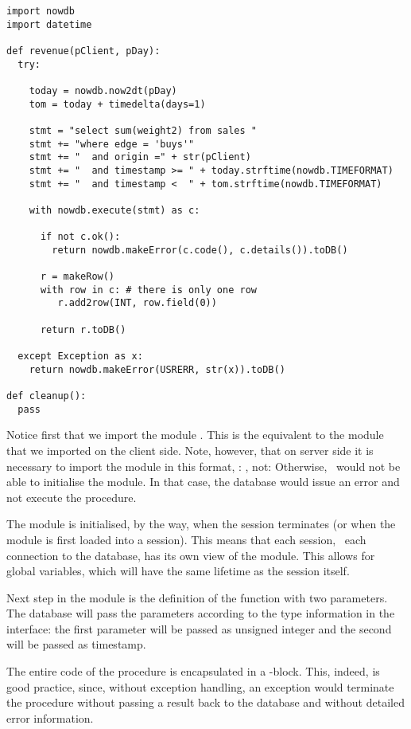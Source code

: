 \begin{python}
\begin{lstlisting}
import nowdb
import datetime

def revenue(pClient, pDay):
  try:

    today = nowdb.now2dt(pDay)
    tom = today + timedelta(days=1)

    stmt = "select sum(weight2) from sales "
    stmt += "where edge = 'buys'"
    stmt += "  and origin =" + str(pClient)
    stmt += "  and timestamp >= " + today.strftime(nowdb.TIMEFORMAT)
    stmt += "  and timestamp <  " + tom.strftime(nowdb.TIMEFORMAT)

    with nowdb.execute(stmt) as c:

      if not c.ok():
        return nowdb.makeError(c.code(), c.details()).toDB()

      r = makeRow()
      with row in c: # there is only one row
         r.add2row(INT, row.field(0))

      return r.toDB()

  except Exception as x:
    return nowdb.makeError(USRERR, str(x)).toDB()

def cleanup():
  pass

\end{lstlisting}
\end{python}

Notice first that we import the module .
This is the equivalent to the  module
that we imported on the client side.
Note, however, that on server side
it is necessary to import the module in this format,
\ie: , not: 
Otherwise, \nowdb\ would not be able to initialise the module.
In that case, the database would issue an error 
and not execute the procedure.

The module is initialised, by the way, when the session
terminates (or when the module is first loaded into a session).
This means
that each session, \ie\ each connection to the database,
has its own view of the module. This allows for
global variables, which will have the same lifetime
as the session itself.

Next step in the module is
the definition of the function  with two parameters.
The database will pass the parameters according to the type
information in the interface: the first parameter
will be passed as unsigned integer and the second
will be passed as timestamp.

The entire code of the procedure is encapsulated
in a -block. This, indeed, is
good practice, since, without exception handling,
an exception would terminate the procedure without
passing a result back to the database and without
detailed error information.

